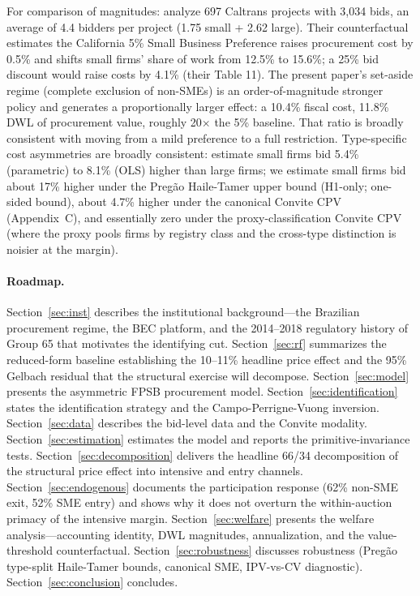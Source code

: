 \documentclass[12pt]{article}
\begin{document}
For comparison of magnitudes: \citet{krasnokutskayaseim2011} analyze
697 Caltrans projects with 3{,}034 bids, an average of 4.4 bidders per
project (1.75 small + 2.62 large). Their counterfactual estimates the
California 5\% Small Business Preference raises procurement cost by
0.5\% and shifts small firms' share of work from 12.5\% to 15.6\%; a
25\% bid discount would raise costs by 4.1\% (their Table 11). The
present paper's set-aside regime (complete exclusion of non-SMEs) is
an order-of-magnitude stronger policy and generates a proportionally
larger effect: a 10.4\% fiscal cost, 11.8\% DWL of procurement value,
roughly 20$\times$ the \citet{krasnokutskayaseim2011} 5\% baseline.
That ratio is broadly consistent with moving from a mild preference
to a full restriction. Type-specific cost asymmetries are broadly consistent:
\citet{krasnokutskayaseim2011} estimate small firms bid 5.4\%
(parametric) to 8.1\% (OLS) higher than large firms; we estimate
small firms bid about 17\% higher under the Preg\~ao Haile-Tamer
upper bound (H1-only; one-sided bound), about 4.7\% higher under the
canonical Convite CPV (Appendix~C), and essentially zero under the
proxy-classification Convite CPV (where the proxy pools firms by
registry class and the cross-type distinction is noisier at the
margin).

\paragraph{Roadmap.}
Section~\ref{sec:inst} describes the institutional background---the
Brazilian procurement regime, the BEC platform, and the 2014--2018
regulatory history of Group 65 that motivates the identifying cut.
Section~\ref{sec:rf} summarizes the reduced-form baseline
establishing the 10--11\% headline price effect and the 95\%
Gelbach residual that the structural exercise will decompose.
Section~\ref{sec:model} presents the asymmetric FPSB procurement model.
Section~\ref{sec:identification} states the identification strategy and
the Campo-Perrigne-Vuong inversion. Section~\ref{sec:data} describes
the bid-level data and the Convite modality.
Section~\ref{sec:estimation} estimates the model and reports the
primitive-invariance tests. Section~\ref{sec:decomposition}
delivers the headline 66/34 decomposition of the structural price
effect into intensive and entry channels.
Section~\ref{sec:endogenous} documents the participation response
(62\% non-SME exit, 52\% SME entry) and shows why it does not
overturn the within-auction primacy of the intensive margin.
Section~\ref{sec:welfare} presents the welfare analysis---accounting
identity, DWL magnitudes, annualization, and the value-threshold
counterfactual.
Section~\ref{sec:robustness} discusses robustness (Preg\~ao type-split
Haile-Tamer bounds, canonical SME, IPV-vs-CV diagnostic).
Section~\ref{sec:conclusion} concludes.
\end{document}
